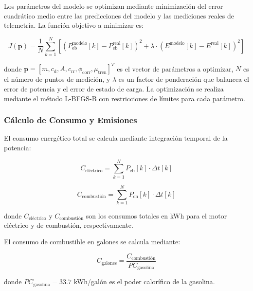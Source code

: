 Los parámetros del modelo se optimizan mediante minimización del error cuadrático medio entre las predicciones del modelo y las mediciones reales de telemetría. La función objetivo a minimizar es:

\begin{equation} 
    J(\mathbf{p}) = \frac{1}{N} \sum_{k=1}^{N} \left[(P_{\mathrm{eb}}^{\mathrm{modelo}}[k] - P_{\mathrm{eb}}^{\mathrm{real}}[k])^2 + \lambda \cdot (E^{\mathrm{modelo}}[k] - E^{\mathrm{real}}[k])^2\right]
    \label{error}
\end{equation}

donde $\mathbf{p} = [m, c_{\mathrm{d}}, A, c_{\mathrm{rr}}, \phi_{\mathrm{corr}}, \mu_{\mathrm{tren}}]^T$ es el vector de parámetros a optimizar, $N$ es el número de puntos de medición, y $\lambda$ es un factor de ponderación que balancea el error de potencia y el error de estado de carga. La optimización se realiza mediante el método L-BFGS-B con restricciones de límites para cada parámetro.

\subsubsection{Cálculo de Consumo y Emisiones}

El consumo energético total se calcula mediante integración temporal de la potencia:

\begin{equation} 
    C_{\mathrm{eléctrico}} = \sum_{k=1}^{N} P_{\mathrm{eb}}[k] \cdot \Delta t[k]
    \label{consumo_electrico}
\end{equation}

\begin{equation} 
    C_{\mathrm{combustión}} = \sum_{k=1}^{N} P_{\mathrm{cn}}[k] \cdot \Delta t[k]
    \label{consumo_combustion}
\end{equation}

donde $C_{\mathrm{eléctrico}}$ y $C_{\mathrm{combustión}}$ son los consumos totales en kWh para el motor eléctrico y de combustión, respectivamente.

El consumo de combustible en galones se calcula mediante:

\begin{equation} 
    C_{\mathrm{galones}} = \frac{C_{\mathrm{combustión}}}{PC_{\mathrm{gasolina}}}
    \label{consumo_galones}
\end{equation}

donde $PC_{\mathrm{gasolina}} = 33.7$ kWh/galón es el poder calorífico de la gasolina.

